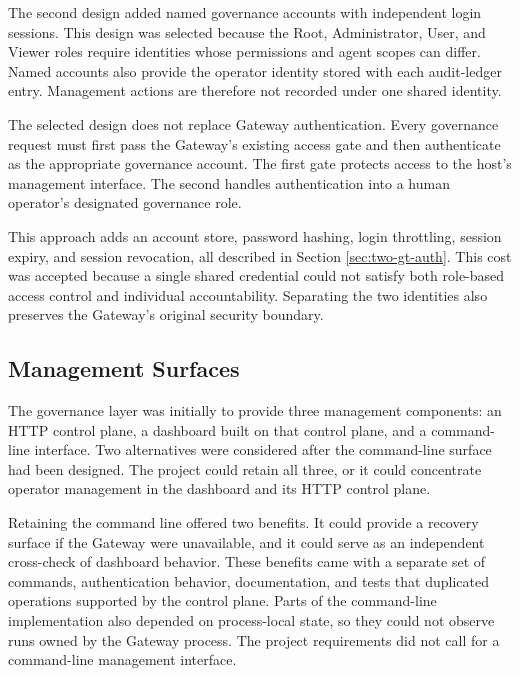 The second design added named governance accounts with independent login
sessions. This design was selected because the Root, Administrator, User, and
Viewer roles require identities whose permissions and agent scopes can differ.
Named accounts also provide the operator identity stored with each audit-ledger
entry. Management actions are therefore not recorded under one shared
identity.

The selected design does not replace Gateway authentication. Every governance
request must first pass the Gateway's existing access gate and then authenticate as the appropriate governance account. The first gate protects access to the host's management interface. The second
handles authentication into a human operator's designated governance role.

This approach adds an account store, password hashing, login throttling,
session expiry, and session revocation, all described in Section \ref{sec:two-gt-auth}. This cost was accepted because a single
shared credential could not satisfy both role-based access control and
individual accountability. Separating the two identities also preserves the
Gateway's original security boundary.


\subsection{Management Surfaces}
\label{sec:gov-management-surfaces}

The governance layer was initially to provide three management components: an HTTP
control plane, a dashboard built on that control plane, and a command-line
interface. Two alternatives were considered after the command-line surface had
been designed. The project could retain all three, or it could concentrate
operator management in the dashboard and its HTTP control plane.

Retaining the command line offered two benefits. It could provide a recovery
surface if the Gateway were unavailable, and it could serve as an independent
cross-check of dashboard behavior. These benefits came with a separate set of
commands, authentication behavior, documentation, and tests that duplicated
operations supported by the control plane. Parts of the command-line
implementation also depended on process-local state, so they could not observe
runs owned by the Gateway process. The project requirements did not call for a
command-line management interface.

